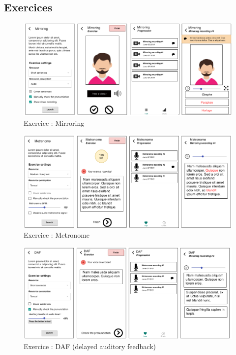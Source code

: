 \begin{appendices}
\section{Exercices}
\begin{figure}[H]
  \includegraphics[width=1\linewidth]{content/imgs/maquette2a.png}
  \caption*{Exercice : Mirroring}
\end{figure}

\begin{figure}[H]
  \includegraphics[width=1\linewidth]{content/imgs/maquette2b.png}
  \caption*{Exercice : Metronome}
\end{figure}

\begin{figure}[H]
  \includegraphics[width=1\linewidth]{content/imgs/maquette2c.png}
  \caption*{Exercice : DAF (delayed auditory feedback)}
\end{figure}


\end{appendices}
